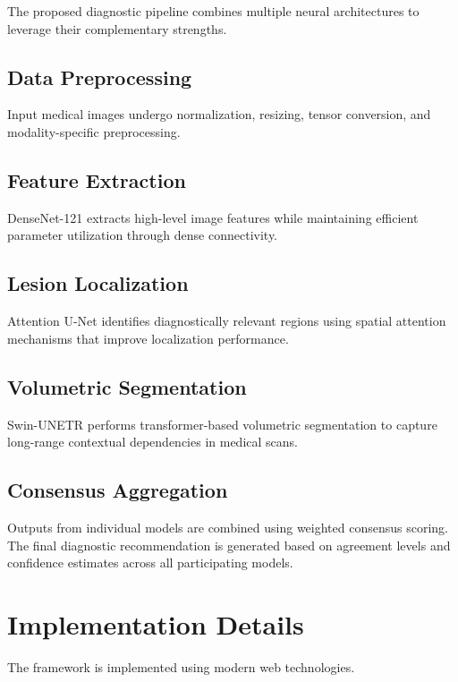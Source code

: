 \documentclass[journal]{IEEEtran}
\begin{document}
The proposed diagnostic pipeline combines multiple neural architectures to leverage their complementary strengths.

\subsection{Data Preprocessing}

Input medical images undergo normalization, resizing, tensor conversion, and modality-specific preprocessing.

\subsection{Feature Extraction}

DenseNet-121 extracts high-level image features while maintaining efficient parameter utilization through dense connectivity.

\subsection{Lesion Localization}

Attention U-Net identifies diagnostically relevant regions using spatial attention mechanisms that improve localization performance.

\subsection{Volumetric Segmentation}

Swin-UNETR performs transformer-based volumetric segmentation to capture long-range contextual dependencies in medical scans.

\subsection{Consensus Aggregation}

Outputs from individual models are combined using weighted consensus scoring. The final diagnostic recommendation is generated based on agreement levels and confidence estimates across all participating models.

\section{Implementation Details}

The framework is implemented using modern web technologies.
\end{document}
